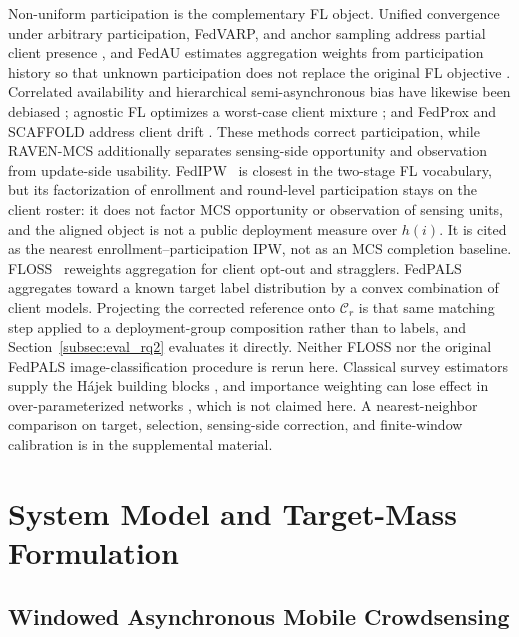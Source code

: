 \documentclass[letterpaper,journal]{IEEEtran}
\begin{document}
Non-uniform participation is the complementary FL object.  Unified convergence
under arbitrary participation, FedVARP, and anchor sampling address partial
client presence \cite{wang2022unified,jhunjhunwala2022fedvarp,wu2023anchor}, and
FedAU estimates aggregation weights from participation history so that unknown
participation does not replace the original FL objective
\cite{wang2024lightweight}.  Correlated availability and hierarchical
semi-asynchronous bias have likewise been debiased
\cite{sun2025debiasing,chen2026fedcure}; agnostic FL optimizes a worst-case
client mixture \cite{mohri2019agnostic}; and FedProx and SCAFFOLD address client
drift \cite{li2020fedprox,karimireddy2020scaffold}.  These methods correct
participation, while RAVEN-MCS additionally separates sensing-side opportunity
and observation from update-side usability.  FedIPW~\cite{morishita2026who} is
closest in the two-stage FL vocabulary, but its factorization of enrollment and
round-level participation stays on the client roster: it does not factor MCS
opportunity or observation of sensing units, and the aligned object is not a
public deployment measure over $h(i)$.  It is cited as the nearest
enrollment--participation IPW, not as an MCS completion baseline.
FLOSS~\cite{goetze2025floss} reweights aggregation for client
opt-out and stragglers.  FedPALS~\cite{listozec2024overcoming} aggregates toward
a known target label distribution by a convex combination of client models.
Projecting the corrected reference onto $\mathcal{C}_r$ is that same matching
step applied to a deployment-group composition rather than to labels, and
Section~\ref{subsec:eval_rq2} evaluates it directly.  Neither FLOSS
nor the original FedPALS image-classification procedure is rerun here.
Classical survey estimators supply the H\'ajek building blocks
\cite{horvitz1952generalization,hajek1971comment,shimodaira2000covariate,robins1994estimation},
and importance weighting can lose effect in over-parameterized networks
\cite{byrd2019importance}, which is not claimed here.  A nearest-neighbor
comparison on target, selection, sensing-side correction, and finite-window
calibration is in the supplemental material.


\section{System Model and Target-Mass Formulation}
\label{sec:system_model}

\subsection{Windowed Asynchronous Mobile Crowdsensing}
\label{subsec:windowed_mcs}
\end{document}

